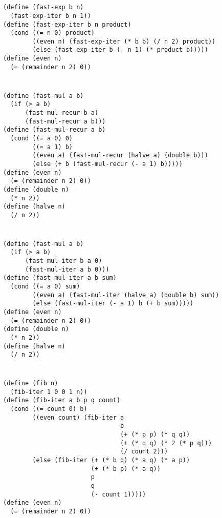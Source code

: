 \documentclass[../main.tex]{subfiles}
\begin{document}
\section{}

\begin{lstlisting}
(define (fast-exp b n)
  (fast-exp-iter b n 1))
(define (fast-exp-iter b n product)
  (cond ((= n 0) product)
        ((even n) (fast-exp-iter (* b b) (/ n 2) product))
        (else (fast-exp-iter b (- n 1) (* product b)))))
(define (even n)
  (= (remainder n 2) 0))
\end{lstlisting}


\section{}

\begin{lstlisting}
(define (fast-mul a b)
  (if (> a b)
      (fast-mul-recur b a)
      (fast-mul-recur a b)))
(define (fast-mul-recur a b)
  (cond ((= a 0) 0)
        ((= a 1) b)
        ((even a) (fast-mul-recur (halve a) (double b)))
        (else (+ b (fast-mul-recur (- a 1) b)))))
(define (even n)
  (= (remainder n 2) 0))
(define (double n)
  (* n 2))
(define (halve n)
  (/ n 2))
\end{lstlisting}


\section{}

\begin{lstlisting}
(define (fast-mul a b)
  (if (> a b)
      (fast-mul-iter b a 0)
      (fast-mul-iter a b 0)))
(define (fast-mul-iter a b sum)
  (cond ((= a 0) sum)
        ((even a) (fast-mul-iter (halve a) (double b) sum))
        (else (fast-mul-iter (- a 1) b (+ b sum)))))
(define (even n)
  (= (remainder n 2) 0))
(define (double n)
  (* n 2))
(define (halve n)
  (/ n 2))
\end{lstlisting}


\section{}

\begin{lstlisting}
(define (fib n)
  (fib-iter 1 0 0 1 n))
(define (fib-iter a b p q count)
  (cond ((= count 0) b)
        ((even count) (fib-iter a
                                b
                                (+ (* p p) (* q q))
                                (+ (* q q) (* 2 (* p q)))
                                (/ count 2)))
        (else (fib-iter (+ (* b q) (* a q) (* a p))
                        (+ (* b p) (* a q))
                        p
                        q
                        (- count 1)))))
(define (even n)
  (= (remainder n 2) 0))
\end{lstlisting}
\end{document}
